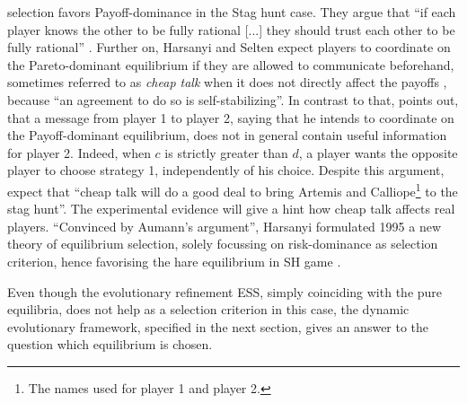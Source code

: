 selection favors Payoff-dominance in the Stag hunt case. They argue that
``if each player knows the other to be fully rational [...] they should trust
each other to be fully rational'' \parencite[89]{harsanyi_general_1988}.
Further on, Harsanyi and Selten expect players to coordinate on the
Pareto-dominant equilibrium if they are allowed to communicate beforehand,
sometimes referred to as \textit{cheap talk} when it does not directly affect
the payoffs \parencite[104]{farrell_cheap_1996}, 
because ``an agreement to do so is self-stabilizing''. 
In contrast to that,
\textcite{aumann_nash_1990} points out, that a message from player 1 to 
player 2, saying that he intends to coordinate on the Payoff-dominant 
equilibrium, does not in general contain useful information for player 2. 
Indeed, when $c$ is strictly greater than $d$, a player wants the opposite 
player to choose strategy 1, independently of his choice.
Despite this argument, 
\textcite[114]{farrell_cheap_1996} expect that 
``cheap talk will do a good deal to
bring Artemis and Calliope\footnote{The names
\textcite{farrell_cheap_1996} used for player 1 and player 2.} 
to the stag hunt''. The experimental evidence will give a hint how cheap
talk affects real players. 
``Convinced by Aumann's argument'', Harsanyi formulated 1995 a new theory
of equilibrium selection, solely focussing on risk-dominance as selection
criterion, hence favorising the hare equilibrium in SH game 
\parencite[92,94,96]{harsanyi_new_1995}. 

Even though the evolutionary refinement ESS, simply coinciding with
the pure equilibria, does not help as a selection
criterion in this case, the dynamic evolutionary framework, specified in the
next section, gives an answer to the question which equilibrium is chosen. 

